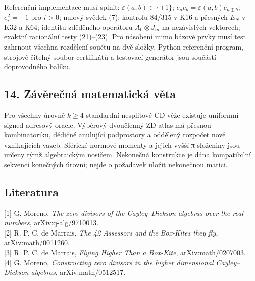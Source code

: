 \documentclass[
  10pt,
]{article}
\begin{document}
Referenční implementace musí splnit: \(\varepsilon(a,b)\in\{\pm1\}\);
\(e_a e_b=\varepsilon(a,b)e_{a\oplus b}\); \(e_i^2=-1\) pro \(i>0\);
nulový svědek (7); kontrolu 84/315 v K16 a přesných \(E_N\) v K32 a K64;
identitu zděděného operátoru \(A_0\otimes J_m\) na nezávislých
vektorech; exaktní racionální testy (21)--(23). Pro násobení mimo bázové
prvky musí test zahrnout všechna rozdělení součtu na dvě složky. Python
referenční program, strojově čitelný soubor certifikátů a testovací
generátor jsou součástí doprovodného balíku.

\subsection{14. Závěrečná matematická
věta}\label{zuxe1vux11breux10dnuxe1-matematickuxe1-vux11bta}

Pro všechny úrovně \(k\ge4\) standardní nesplitové CD věže existuje
uniformní signed adresový oracle. Výběrový dvoučlenný ZD atlas má
přesnou kombinatoriku, dědičné anulující podprostory a oddělený rozpočet
nově vznikajících vazeb. Sférické normové momenty a jejich vyšší-π
složeniny jsou určeny týmž algebraickým nosičem. Nekonečná konstrukce je
dána kompatibilní sekvencí konečných úrovní; nejde o požadavek uložit
nekonečnou matici.

\subsection{Literatura}\label{literatura}

{[}1{]} G. Moreno, \emph{The zero divisors of the Cayley--Dickson
algebras over the real numbers}, arXiv:q-alg/9710013.\\
{[}2{]} R. P. C. de Marrais, \emph{The 42 Assessors and the Box-Kites
they fly}, arXiv:math/0011260.\\
{[}3{]} R. P. C. de Marrais, \emph{Flying Higher Than a Box-Kite},
arXiv:math/0207003.\\
{[}4{]} G. Moreno, \emph{Constructing zero divisors in the higher
dimensional Cayley--Dickson algebras}, arXiv:math/0512517.
\end{document}
